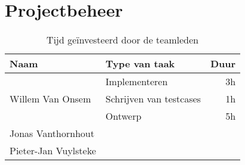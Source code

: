 \section{Projectbeheer}
\label{projectbeheer}
\begin{table}[H]
\centering
\begin{tabular}{|llr|}
\hline
Naam&Type van taak&Duur\\
\hline
\hline
\multirow{3}{*}{Willem Van Onsem}&Implementeren&3h\\
&Schrijven van testcases&1h\\
&Ontwerp&5h\\
\hline
Jonas Vanthornhout&&\\
\hline
Pieter-Jan Vuylsteke&&\\
\hline
\end{tabular}
\caption{Tijd ge\"investeerd door de teamleden}
\label{tbl:timeUsage}
\end{table}
